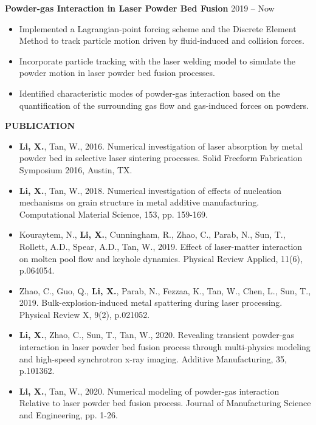 \documentclass[12pt, letterpaper]{article}
\begin{document}
\vspace{3pt}

\textbf{Powder-gas Interaction in Laser Powder Bed Fusion} \hfill 2019 -- Now
\begin{itemize}[leftmargin=*, labelsep=5mm]
   \item Implemented a Lagrangian-point forcing scheme and the Discrete Element Method to track
      particle motion driven by fluid-induced and collision forces. 
   \item Incorporate particle tracking with the laser welding model to simulate the powder
      motion in laser powder bed fusion processes.
   \item Identified characteristic modes of powder-gas interaction based on the quantification of
      the surrounding gas flow and gas-induced forces on powders.
\end{itemize}


\vspace{-3pt}
\paraspace

\textbf{PUBLICATION}

\fullrule

\begin{itemize}[leftmargin=*, labelsep=4mm]
   \item \textbf{Li, X.}, Tan, W., 2016. Numerical investigation of laser absorption by metal powder
      bed in selective laser sintering processes. Solid Freeform Fabrication Symposium 2016, Austin,
      TX.

   \item \textbf{Li, X.}, Tan, W., 2018. Numerical investigation of effects of nucleation mechanisms
      on grain structure in metal additive manufacturing. Computational Material Science, 153, pp.
      159-169.

   \item Kouraytem, N., \textbf{Li, X.}, Cunningham, R., Zhao, C., Parab, N., Sun, T., Rollett,
      A.D., Spear, A.D., Tan, W., 2019. Effect of laser-matter interaction on molten pool flow and
      keyhole dynamics. Physical Review Applied, 11(6), p.064054.

   \item Zhao, C., Guo, Q., \textbf{Li, X.}, Parab, N., Fezzaa, K., Tan, W., Chen, L., Sun, T.,
      2019. Bulk-explosion-induced metal spattering during laser processing. Physical Review X,
      9(2), p.021052.

   \item \textbf{Li, X.}, Zhao, C., Sun, T., Tan, W., 2020. Revealing transient powder-gas
      interaction in laser powder bed fusion process through multi-physics modeling and high-speed
      synchrotron x-ray imaging. Additive Manufacturing, 35, p.101362. 

   \item \textbf{Li, X.}, Tan, W., 2020. Numerical modeling of powder-gas interaction Relative to
      laser powder bed fusion process. Journal of Manufacturing Science and Engineering, pp. 1-26.
\end{itemize}
\vspace{-3pt}
\paraspace
\end{document}
